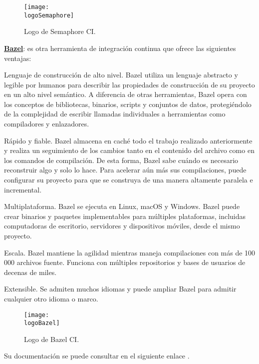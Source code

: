 \begin{compactitem}
    \begin{figure}[h]
        \centering
        \texttt{[image: \\logoSemaphore]}
        \caption{Logo de Semaphore CI.}
    \end{figure}
    \item \textbf{\underline{Bazel}}: es otra herramienta de integración continua que ofrece las siguientes ventajas:
    \begin{compactitem}
        \item Lenguaje de construcción de alto nivel. Bazel utiliza un lenguaje abstracto y legible por humanos para describir las propiedades de construcción de su proyecto en un alto nivel semántico. A diferencia de otras herramientas, Bazel opera con los conceptos de bibliotecas, binarios, scripts y conjuntos de datos, protegiéndolo de la complejidad de escribir llamadas individuales a herramientas como compiladores y enlazadores.
        \item Rápido y fiable. Bazel almacena en caché todo el trabajo realizado anteriormente y realiza un seguimiento de los cambios tanto en el contenido del archivo como en los comandos de compilación. De esta forma, Bazel sabe cuándo es necesario reconstruir algo y solo lo hace. Para acelerar aún más sus compilaciones, puede configurar su proyecto para que se construya de una manera altamente paralela e incremental.
        \item Multiplataforma. Bazel se ejecuta en Linux, macOS y Windows. Bazel puede crear binarios y paquetes implementables para múltiples plataformas, incluidas computadoras de escritorio, servidores y dispositivos móviles, desde el mismo proyecto.
        \item Escala. Bazel mantiene la agilidad mientras maneja compilaciones con más de 100 000 archivos fuente. Funciona con múltiples repositorios y bases de usuarios de decenas de miles.
        \item Extensible. Se admiten muchos idiomas y puede ampliar Bazel para admitir cualquier otro idioma o marco.
    \end{compactitem}
    \begin{figure}[h]
        \centering
        \texttt{[image: \\logoBazel]}
        \caption{Logo de Bazel CI.}
    \end{figure}

    Su documentación se puede consultar en el siguiente enlace \cite{bazel}.

\end{compactitem}

